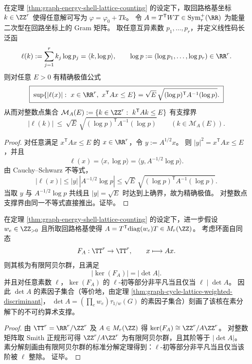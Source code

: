 \begin{proposition}\label{prop:graph-energy-ellipsoid-godel-codelength-dual}
在定理 \ref{thm:graph-energy-shell-lattice-counting} 的设定下，取回路格基坐标 \(k\in\ZZ^r\) 使得任意解可写为 \(\varphi=\varphi_0+Tk\)。
令 \(A=T^{\mathsf T}WT\in\mathrm{Sym}_r^+(\RR)\) 为能量二次型在回路坐标上的 Gram 矩阵。
取任意互异素数 \(p_1,\dots,p_r\)，并定义线性码长泛函
\[
\ell(k):=\sum_{j=1}^r k_j\log p_j=\langle k,\log p\rangle,
\qquad
\log p:=(\log p_1,\dots,\log p_r)\in\RR^r.
\]
则对任意 \(E>0\) 有精确极值公式
\[
\boxed{\;
\sup\{|\ell(x)|:\ x\in\RR^r,\ x^{\mathsf T}Ax\le E\}
=\sqrt E\,\sqrt{(\log p)^{\mathsf T}A^{-1}(\log p)}.
\;}
\]
从而对整数点集合
\(
\mathcal M_A(E):=\{k\in\ZZ^r:\ k^{\mathsf T}Ak\le E\}
\)
有支撑界
\[
|\ell(k)|\ \le\ \sqrt E\,\sqrt{(\log p)^{\mathsf T}A^{-1}(\log p)}
\qquad (k\in\mathcal M_A(E)).
\]
\end{proposition}
\begin{proof}
对任意满足 \(x^{\mathsf T}Ax\le E\) 的 \(x\in\RR^r\)，令 \(y:=A^{1/2}x\)。
则 \(|y|^2=x^{\mathsf T}Ax\le E\)，并且
\[
\ell(x)=\langle x,\log p\rangle=\langle y, A^{-1/2}\log p\rangle.
\]
由 Cauchy--Schwarz 不等式，
\[
|\ell(x)|
\le
|y|\,|A^{-1/2}\log p|
\le
\sqrt E\,\sqrt{(\log p)^{\mathsf T}A^{-1}(\log p)}.
\]
当取 \(y\) 与 \(A^{-1/2}\log p\) 共线且 \(|y|=\sqrt E\) 时达到上确界，故为精确极值。
对整数点支撑界由同一不等式直接推出。证毕。
\end{proof}

\begin{corollary}[行列式素支撑与核结构的不可约算术障碍]\label{cor:graph-cycle-lattice-determinant-prime-support}
在定理 \ref{thm:graph-energy-shell-lattice-counting} 的设定下，进一步假设 \(w_e\in\ZZ_{>0}\) 且所取回路格基使得 \(A=T^{\mathsf T}\mathrm{diag}(w_e)T\in M_r(\ZZ)\)。
考虑环面自同态
\[
F_A:\TT^r\to\TT^r,\qquad x\longmapsto Ax.
\]
则其核为有限阿贝尔群，且满足
\[
|\ker(F_A)|=|\det A|.
\]
并且对任意素数 \(\ell\)，\(\ker(F_A)\) 的 \(\ell\)-初等部分非平凡当且仅当 \(\ell\mid \det A\)。
因此 \(\det A\) 的素因子集合（等价地，由定理 \ref{thm:graph-cycle-lattice-weighted-discriminant}，
\(\det A=(\prod_e w_e)\tau_{1/w}(G)\) 的素因子集合）刻画了该核在素分解下的不可约算术支撑。
\end{corollary}
\begin{proof}
由 \(\TT^r=\RR^r/\ZZ^r\) 及 \(A\in M_r(\ZZ)\) 得 \(\ker(F_A)\cong \ZZ^r/A\ZZ^r\)。
对整数矩阵取 Smith 正规形可得 \(\ZZ^r/A\ZZ^r\) 为有限阿贝尔群，且其阶等于 \(|\det A|\)。
素分解刻画由有限阿贝尔群的标准分解定理得到：\(\ell\)-初等部分非平凡当且仅当该阶被 \(\ell\) 整除。
证毕。
\end{proof}

\endinput

